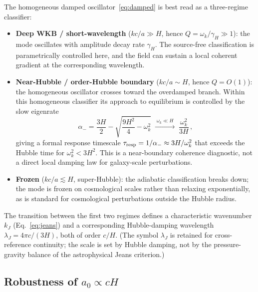\documentclass[11pt]{article}
\begin{document}
The homogeneous damped oscillator~\eqref{eq:damped} is best read as a three-regime classifier:
\begin{itemize}
\item \textbf{Deep WKB / short-wavelength} ($kc/a\gg H$, hence $Q=\omega_k/\gamma_H\gg1$): the mode oscillates with amplitude decay rate $\gamma_H$.  The source-free classification is parametrically controlled here, and the field can sustain a local coherent gradient at the corresponding wavelength.
\item \textbf{Near-Hubble / order-Hubble boundary} ($kc/a\sim H$, hence $Q=O(1)$): the homogeneous oscillator crosses toward the overdamped branch.  Within this homogeneous classifier its approach to equilibrium is controlled by the slow eigenrate
\begin{equation}
\alpha_- = \frac{3H}{2}-\sqrt{\frac{9H^2}{4}-\omega_k^2}
  \;\xrightarrow{\;\omega_k\ll H\;}\;
  \frac{\omega_k^2}{3H}\,,
\label{eq:alpha_slow}
\end{equation}
giving a formal response timescale $\tau_{\rm resp}=1/\alpha_-\approx 3H/\omega_k^2$ that exceeds the Hubble time for $\omega_k^2 < 3H^2$.  This is a near-boundary coherence diagnostic, not a direct local damping law for galaxy-scale perturbations.
\item \textbf{Frozen} ($kc/a \lesssim H$, super-Hubble): the adiabatic classification breaks down; the mode is frozen on cosmological scales rather than relaxing exponentially, as is standard for cosmological perturbations outside the Hubble radius.
\end{itemize}
The transition between the first two regimes defines a characteristic wavenumber $k_J$ (Eq.~\eqref{eq:jeans}) and a corresponding Hubble-damping wavelength $\lambda_J = 4\pi c/(3H)$, both of order $c/H$.  (The symbol $\lambda_J$ is retained for cross-reference continuity; the scale is set by Hubble damping, not by the pressure-gravity balance of the astrophysical Jeans criterion.)

\subsection[Robustness of a0 proportional to cH]{Robustness of $a_0\propto cH$}
\end{document}
